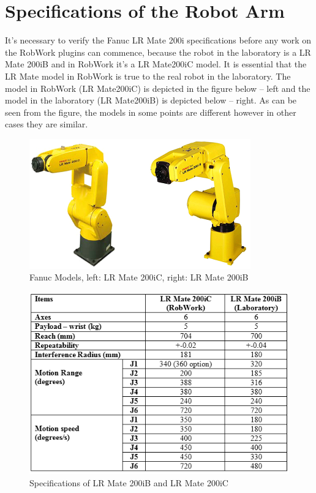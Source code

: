 \section{Specifications of the Robot Arm}
\label{sec:spec}

It's necessary to verify the Fanuc LR Mate 200i specifications before any work on the RobWork plugins can commence, because the robot in the laboratory is a LR Mate 200iB and in RobWork it's a LR Mate200iC model. It is essential that the LR Mate model in RobWork is true to the real robot in the laboratory. The model in RobWork (LR Mate200iC) is depicted in the figure below – left and the model in the laboratory (LR Mate200iB) is depicted below – right. As can be seen from the figure, the models in some points are different however in other cases they are similar.

\begin{figure}[H]
  \centering
  \includegraphics[scale= 0.8]{source/fanucModelPhoto.png}
  \caption{Fanuc Models, left: LR Mate 200iC, right: LR Mate 200iB}
  \label{fig:FanucModels}
\end{figure}

\begin{figure}[H]
  \centering
  \includegraphics[scale= 0.8]{source/table1.png}
  \caption{Specifications of LR Mate 200iB and LR Mate 200iC}
  \label{fig:tableSpecifications}
\end{figure}

